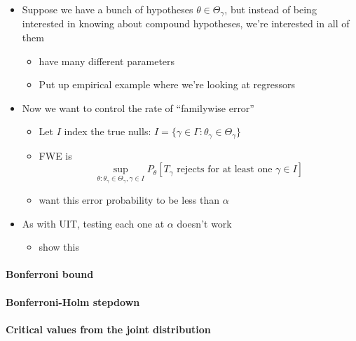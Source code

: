 \begin{itemize}
\item Suppose we have a bunch of hypotheses $θ ∈ Θ_γ$, but instead of
  being interested in knowing about compound hypotheses, we're
  interested in all of them
\begin{itemize}
\item have many different parameters
\item Put up empirical example where we're looking at regressors
\end{itemize}
\item Now we want to control the rate of ``familywise error''
\begin{itemize}
\item Let $I$ index the true nulls: $I = \{γ ∈ Γ : θ_γ ∈ Θ_γ\}$
\item FWE is \[\sup_{θ: θ_γ ∈ Θ_γ, γ ∈ I} P_θ[T_γ \text{ rejects for at least one } γ ∈ I]\]
\item want this error probability to be less than $α$
\end{itemize}
\item As with UIT, testing each one at $α$ doesn't work
\begin{itemize}
\item show this
\end{itemize}
\end{itemize}

\paragraph{Bonferroni bound}

\paragraph{Bonferroni-Holm stepdown}

\paragraph{Critical values from the joint distribution}

